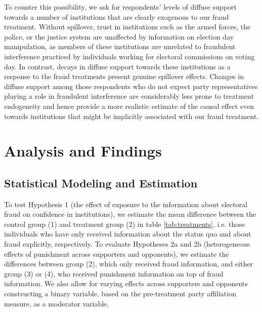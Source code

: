 \documentclass[11pt, ngerman,english,a4]{article}
\begin{document}
To counter this possibility, 
we ask for respondents' levels of diffuse support towards a number of institutions that are clearly exogenous to our fraud treatment. 
Without spillover, trust in institutions such as the armed forces, the police, or the justice system are unaffected by information on election day manipulation, as members of these institutions are unrelated to fraudulent interference practiced by individuals working for electoral commissions on voting day. 
In contrast, decays in diffuse support towards these institutions as a response to the fraud treatments present genuine spillover effects. 
Changes in diffuse support among those respondents who do not expect party representatives playing a role in fraudulent interference are considerably less prone to treatment endogeneity and hence provide a more realistic estimate of the causal effect even towards institutions that might be implicitly associated with our fraud treatment. 

\newpage
\section*{Analysis and Findings}

\subsection*{Statistical Modeling and Estimation}

To test Hypothesis 1 (the effect of exposure to the information about electoral fraud on confidence in institutions), we estimate the mean difference between the control group (1) and treatment group (2) in table \ref{tab:treatments}, i.e. those individuals who have only received information about the status quo and about fraud explicitly, respectively.
To evaluate Hypotheses 2a and 2b (heterogeneous effects of punishment across supporters and opponents), we estimate the differences between group (2), which only received fraud information, and either group (3) or (4), who received punishment information on top of fraud information. We also allow for varying effects across supporters and opponents constructing a binary variable, based on the pre-treatment party affiliation measure, as a moderator variable. 
\end{document}

